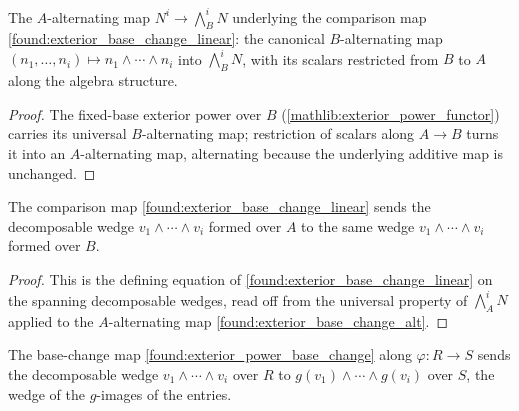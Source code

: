 \begin{lemma}
  \label{found:exterior_base_change_alt}
  The \(A\)-alternating map \(N^i\to\bigwedge^i_B N\) underlying the comparison map
  \cref{found:exterior_base_change_linear}: the canonical \(B\)-alternating map
  \((n_1,\dots,n_i)\mapsto n_1\wedge\cdots\wedge n_i\) into \(\bigwedge^i_B N\),
  with its scalars restricted from \(B\) to \(A\) along the algebra structure.
\end{lemma}

\begin{proof}
  \leanok
  The fixed-base exterior power over \(B\) (\cref{mathlib:exterior_power_functor})
  carries its universal \(B\)-alternating map; restriction of scalars along
  \(A\to B\) turns it into an \(A\)-alternating map, alternating because the
  underlying additive map is unchanged.
\end{proof}

\begin{lemma}
  \label{found:exterior_base_change_apply_iotamulti}
  The comparison map \cref{found:exterior_base_change_linear} sends the
  decomposable wedge \(v_1\wedge\cdots\wedge v_i\) formed over \(A\) to the same
  wedge \(v_1\wedge\cdots\wedge v_i\) formed over \(B\).
\end{lemma}

\begin{proof}
  \leanok
  This is the defining equation of \cref{found:exterior_base_change_linear} on the
  spanning decomposable wedges, read off from the universal property of
  \(\bigwedge^i_A N\) applied to the \(A\)-alternating map
  \cref{found:exterior_base_change_alt}.
\end{proof}

\begin{lemma}
  \label{found:exterior_base_change_map_apply_iotamulti}
  The base-change map \cref{found:exterior_power_base_change} along
  \(\varphi:R\to S\) sends the decomposable wedge \(v_1\wedge\cdots\wedge v_i\)
  over \(R\) to \(g(v_1)\wedge\cdots\wedge g(v_i)\) over \(S\), the wedge of the
  \(g\)-images of the entries.
\end{lemma}

